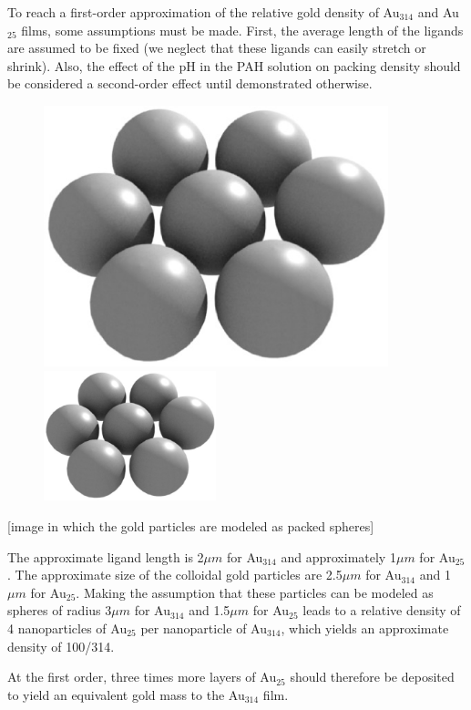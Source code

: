 \documentclass[12pt,oneside,english]{article}
\begin{document}
	To reach a first-order approximation of the relative gold density of Au$_{314}$ and Au$_{25}$ films, some assumptions must be made.
	First, the average length of the ligands are assumed to be fixed (we neglect that these ligands can easily stretch or shrink).
	Also, the effect of the pH in the PAH solution on packing density should be considered a second-order effect until demonstrated otherwise.	
	
	\begin{figure}
		\includegraphics[width=100mm]{images/willitblend.eps}
		\includegraphics[width=50mm]{images/willitblend.eps}
	\end{figure}
	[image in which the gold particles are modeled as packed spheres]	
	
	The approximate ligand length is 2${\mu}m$ for Au$_{314}$ and approximately 1${\mu}m$ for Au$_{25}$.
	The approximate size of the colloidal gold particles are 2.5${\mu}m$ for Au$_{314}$ and 1${\mu}m$ for Au$_{25}$.
	Making the assumption that these particles can be modeled as spheres of radius 3${\mu}m$ for Au$_{314}$ and 1.5${\mu}m$ for Au$_{25}$ leads to a relative density of 4 nanoparticles of Au$_{25}$ per nanoparticle of Au$_{314}$, which yields an approximate density of 100/314.
	
	At the first order, three times more layers of Au$_{25}$ should therefore be deposited to yield an equivalent gold mass to the Au$_{314}$ film.
	
\end{document}
